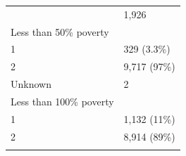 \documentclass[]{article}
\begin{document}
\begin{longtable}[]{@{}ll@{}}
\begin{minipage}[t]{0.71\columnwidth}
\end{minipage} & \begin{minipage}[t]{0.23\columnwidth}\raggedright
1,926\strut
\end{minipage}\tabularnewline
\begin{minipage}[t]{0.71\columnwidth}\raggedright
Less than 50\% poverty\strut
\end{minipage} & \begin{minipage}[t]{0.23\columnwidth}\raggedright
\strut
\end{minipage}\tabularnewline
\begin{minipage}[t]{0.71\columnwidth}\raggedright
1\strut
\end{minipage} & \begin{minipage}[t]{0.23\columnwidth}\raggedright
329 (3.3\%)\strut
\end{minipage}\tabularnewline
\begin{minipage}[t]{0.71\columnwidth}\raggedright
2\strut
\end{minipage} & \begin{minipage}[t]{0.23\columnwidth}\raggedright
9,717 (97\%)\strut
\end{minipage}\tabularnewline
\begin{minipage}[t]{0.71\columnwidth}\raggedright
Unknown\strut
\end{minipage} & \begin{minipage}[t]{0.23\columnwidth}\raggedright
2\strut
\end{minipage}\tabularnewline
\begin{minipage}[t]{0.71\columnwidth}\raggedright
Less than 100\% poverty\strut
\end{minipage} & \begin{minipage}[t]{0.23\columnwidth}\raggedright
\strut
\end{minipage}\tabularnewline
\begin{minipage}[t]{0.71\columnwidth}\raggedright
1\strut
\end{minipage} & \begin{minipage}[t]{0.23\columnwidth}\raggedright
1,132 (11\%)\strut
\end{minipage}\tabularnewline
\begin{minipage}[t]{0.71\columnwidth}\raggedright
2\strut
\end{minipage} & \begin{minipage}[t]{0.23\columnwidth}\raggedright
8,914 (89\%)\strut
\end{minipage}\tabularnewline
\begin{minipage}[t]{0.71\columnwidth}\raggedright

\end{minipage}
\end{longtable}
\end{document}
